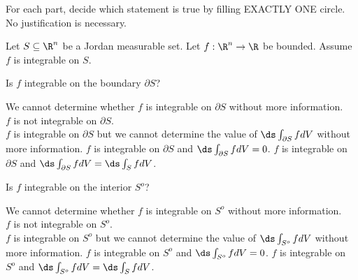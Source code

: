 \documentclass{exam}
\begin{document}
\begin{questions}
\begin{parts}
\end{parts}



\pagebreak
\question For each part, decide which statement is true by filling EXACTLY ONE circle. No justification is necessary. 


Let $S \subseteq \R^n$ be a Jordan measurable set. Let $f : \R^n \to \R$ be bounded. Assume $f$ is integrable on $S$. 



\CorrectChoiceCircle
\begin{parts}
	
	\item Is $f$ integrable on the boundary $\partial S$?	\\[-3pt]
	
	\begin{checkboxes}
		\choice We cannot determine whether $f$ is integrable on $\partial S$ without more information. \\[-3pt]
		\choice $f$ is not integrable on $\partial S$.\\[-3pt]
		\choice $f$ is integrable on $\partial S$ but we cannot determine the value of $\ds\int_{\partial S} f dV$ without more information. 	
		\CorrectChoice $f$ is integrable on $\partial S$ and $\ds\int_{\partial S} f dV =0$.
		\choice $f$ is integrable on $\partial S$ and $\ds\int_{\partial S} f dV = \ds\int_S fdV$.
	\end{checkboxes}
	\medskip

	\item Is $f$ integrable on the interior $S^o$?	\\[-3pt]
	\begin{checkboxes}
		\choice We cannot determine whether $f$ is integrable on $S^o$ without more information. \\[-3pt]
		\choice $f$ is not integrable on $S^o$.\\[-3pt]
		\choice $f$ is integrable on $S^o$ but we cannot determine the value of $\ds\int_{S^o} f dV$ without more information. 	
		\choice $f$ is integrable on $S^o$ and $\ds\int_{S^o} f dV =0$.
		\CorrectChoice $f$ is integrable on $S^o$ and $\ds\int_{S^o} f dV = \ds\int_S fdV$.
	\end{checkboxes}
	\medskip


\end{parts}
\end{questions}
\end{document}
